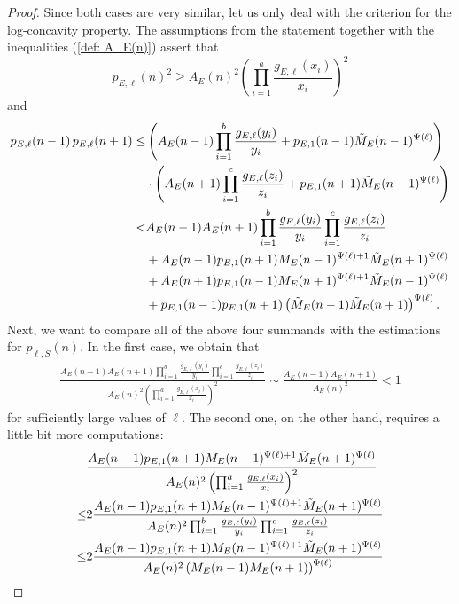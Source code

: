 \documentclass[12pt]{amsart}
\theoremstyle{definition}
\theoremstyle{remark}
\numberwithin{theorem}{section} \numberwithin{equation}{section}
\begin{document}
\begin{proof}
Since both cases are very similar, let us only deal with the criterion for the log-concavity property. The assumptions from the statement together with the inequalities (\ref{def: A_E(n)}) assert that
\begin{equation*}
p_{E,\ell }(n)^2\geq A_E(n)^2\left(\prod_{i=1}^a\frac{g_{E,\ell }(x_i)}{x_i}\right)^2
\end{equation*}
and
\begin{align*}
p_{E,\ell }(n-1) \, p_{E,\ell }(n+1)\leq &\left(A_E(n-1)\prod_{i=1}^b\frac{g_{E,\ell }(y_i)}{y_i}+p_{E,1}(n-1)\Tilde{M}_E(n-1)^{\Psi(\ell)}\right)\\
&{}\cdot
\left(A_E(n+1)\prod_{i=1}^c\frac{g_{E,\ell }(z_i)}{z_i}+p_{E,1}(n+1)\Tilde{M}_E(n+1)^{\Psi(\ell)}\right)\\
<& A_E(n-1)A_E(n+1)\prod_{i=1}^b\frac{g_{E,\ell }(y_i)}{y_i}\prod_{i=1}^c\frac{g_{E,\ell }(z_i)}{z_i}\\
&{}+
A_E(n-1)p_{E,1}(n+1)M_E(n-1)^{\Psi(\ell)+1}\Tilde{M}_E(n+1)^{\Psi(\ell)}\\
&{}+
A_E(n+1)p_{E,1}(n-1)M_E(n+1)^{\Psi(\ell)+1}\Tilde{M}_E(n-1)^{\Psi(\ell)}\\
&{}+
p_{E,1}(n-1)p_{E,1}(n+1)\left(\Tilde{M}_E(n-1)\Tilde{M}_E(n+1)\right)^{\Psi(\ell)}.
\end{align*}
Next, we want to compare all of the above four summands with the estimations for $p_{\ell,S}(n)$.
In the first case, we obtain that
\begin{align*}
\frac{A_E(n-1)A_E(n+1)\prod_{i=1}^b\frac{g_{E,\ell }(y_i)}{y_i}\prod_{i=1}^c\frac{g_{E,\ell }(z_i)}{z_i}}{A_E(n)^2\left(\prod_{i=1}^a\frac{g_{E,\ell }(x_i)}{x_i}\right)^2}
\sim \frac{A_E(n-1)A_E(n+1)}{A_E(n)^2}<1
\end{align*}
for sufficiently large values of
$\ell $.
The second one, on the other hand, requires a little bit more computations:
\begin{align*}
&\frac{A_E(n-1)p_{E,1}(n+1)M_E(n-1)^{\Psi(\ell)+1}\Tilde{M}_E(n+1)^{\Psi(\ell)}}{A_E(n)^2\left(\prod_{i=1}^a\frac{g_{E,\ell }(x_i)}{x_i}\right)^2}\\
\leq
&2\frac{A_E(n-1)p_{E,1}(n+1)M_E(n-1)^{\Psi(\ell)+1}\Tilde{M}_E(n+1)^{\Psi(\ell)}}{A_E(n)^2\prod_{i=1}^b\frac{g_{E,\ell }(y_i)}{y_i}\prod_{i=1}^c\frac{g_{E,\ell }(z_i)}{z_i}}\\
\leq& 2\frac{A_E(n-1)p_{E,1}(n+1)M_E(n-1)^{\Psi(\ell)+1}\Tilde{M}_E(n+1)^{\Psi(\ell)}}{A_E(n)^2\left(M_E(n-1)M_E(n+1)\right)^{\Phi(\ell)}}\\

\end{align*}
\end{proof}
\end{document}

